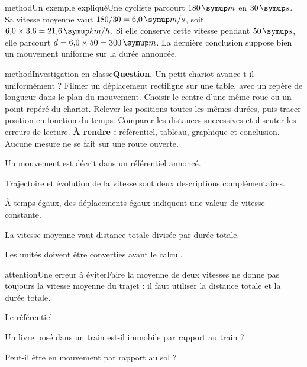 \begin{pcEncadre}{method}{Un exemple expliqué}Une cycliste parcourt $180\unite m$ en $30\unite s$. Sa vitesse moyenne vaut $180/30=6{,}0\unite{m/s}$, soit $6{,}0\times3{,}6=21{,}6\unite{km/h}$. Si elle conserve cette vitesse pendant $50\unite s$, elle parcourt $d=6{,}0\times50=300\unite m$. La dernière conclusion suppose bien un mouvement uniforme sur la durée annoncée.\end{pcEncadre}
\label{activite-9}
\begin{pcEncadre}{method}{Investigation en classe}\textbf{Question.} Un petit chariot avance-t-il uniformément ? Filmer un déplacement rectiligne sur une table, avec un repère de longueur dans le plan du mouvement. Choisir le centre d’une même roue ou un point repéré du chariot. Relever les positions toutes les mêmes durées, puis tracer position en fonction du temps. Comparer les distances successives et discuter les erreurs de lecture. \textbf{À rendre :} référentiel, tableau, graphique et conclusion. Aucune mesure ne se fait sur une route ouverte.\end{pcEncadre}
\begin{questions}
\item Un mouvement est décrit dans un référentiel annoncé.
\item Trajectoire et évolution de la vitesse sont deux descriptions complémentaires.
\item À temps égaux, des déplacements égaux indiquent une valeur de vitesse constante.
\item La vitesse moyenne vaut distance totale divisée par durée totale.
\item Les unités doivent être converties avant le calcul.
\end{questions}
\begin{pcEncadre}{attention}{Une erreur à éviter}Faire la moyenne de deux vitesses ne donne pas toujours la vitesse moyenne du trajet : il faut utiliser la distance totale et la durée totale.\end{pcEncadre}
\pcGrille
\clearpage{}
\par\noindent\begin{minipage}{\linewidth}
\begin{exercice}[1]{Le référentiel}
\begin{questions}
\item Un livre posé dans un train est-il immobile par rapport au train ?
\item Peut-il être en mouvement par rapport au sol ?
\end{questions}
\end{exercice}
\end{minipage}
